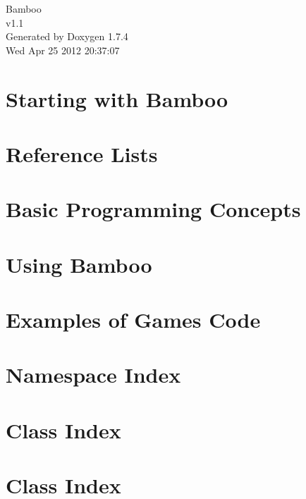 \documentclass[a4paper]{book}
\begin{document}
\hypersetup{pageanchor=false}
\begin{titlepage}
\vspace*{7cm}
\begin{center}
{\Large Bamboo \\[1ex]\large v1.1 }\\
\vspace*{1cm}
{\large Generated by Doxygen 1.7.4}\\
\vspace*{0.5cm}
{\small Wed Apr 25 2012 20:37:07}\\
\end{center}
\end{titlepage}
\clearemptydoublepage
{}
\tableofcontents
\clearemptydoublepage
{}
\hypersetup{pageanchor=true}
\chapter{Starting with Bamboo}
\label{index}\hypertarget{index}{}
\chapter{Reference Lists}
\label{ReferenceLists}
\hypertarget{ReferenceLists}{}

\chapter{Basic Programming Concepts}
\label{ProgrammingBasics}
\hypertarget{ProgrammingBasics}{}

\chapter{Using Bamboo}
\label{UsingEnginePage}
\hypertarget{UsingEnginePage}{}

\chapter{Examples of Games Code}
\label{CodeProgramExamples}
\hypertarget{CodeProgramExamples}{}

\chapter{Namespace Index}

\chapter{Class Index}

\chapter{Class Index}

\end{document}
